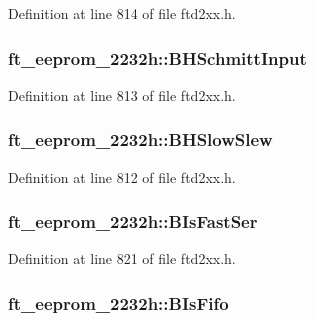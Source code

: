 Definition at line 814 of file ftd2xx.h.\hypertarget{structft__eeprom__2232h_a698ed4dae2f5efd99edcb349bc9d26dc}{
\subsubsection[{BHSchmittInput}]{ {\bf ft\_\-eeprom\_\-2232h::BHSchmittInput}}}
\label{structft__eeprom__2232h_a698ed4dae2f5efd99edcb349bc9d26dc}


Definition at line 813 of file ftd2xx.h.\hypertarget{structft__eeprom__2232h_ab371dbca25fb1d51359031c74cd6821b}{
\subsubsection[{BHSlowSlew}]{ {\bf ft\_\-eeprom\_\-2232h::BHSlowSlew}}}
\label{structft__eeprom__2232h_ab371dbca25fb1d51359031c74cd6821b}


Definition at line 812 of file ftd2xx.h.\hypertarget{structft__eeprom__2232h_a1e713eb322844d1d45e0439087571133}{
\subsubsection[{BIsFastSer}]{ {\bf ft\_\-eeprom\_\-2232h::BIsFastSer}}}
\label{structft__eeprom__2232h_a1e713eb322844d1d45e0439087571133}


Definition at line 821 of file ftd2xx.h.\hypertarget{structft__eeprom__2232h_a967db8f183ffb34000282afa58f5fd0a}{
\subsubsection[{BIsFifo}]{ {\bf ft\_\-eeprom\_\-2232h::BIsFifo}}}
\label{structft__eeprom__2232h_a967db8f183ffb34000282afa58f5fd0a}


